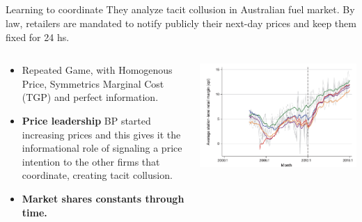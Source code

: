\documentclass[10pt]{beamer}
\begin{document}
\subsection{}


\begin{frame}[fragile]{Learning to coordinate}
They analyze tacit collusion in Australian fuel market. By law, retailers are mandated to notify publicly their next-day prices and keep them fixed for 24 hs.

    \begin{columns}
        \begin{column}{0.55\textwidth}
            \begin{itemize}
                \item Repeated Game, with Homogenous Price, Symmetrics Marginal Cost (TGP) and perfect information.
                \item \textbf{Price leadership} BP started increasing prices and this gives it the informational role of signaling a price intention to the other firms that coordinate, creating tacit collusion.
                \item \textbf{Market shares constants through time.}
            \end{itemize}
        \end{column}
    
        \begin{column}{0.55\textwidth}
            \includegraphics[width=\linewidth]{slides_pricing_collusion/imgs/avg_margins_by_firm.png}
            
        \end{column}
    \end{columns}

\end{frame}
\end{document}
